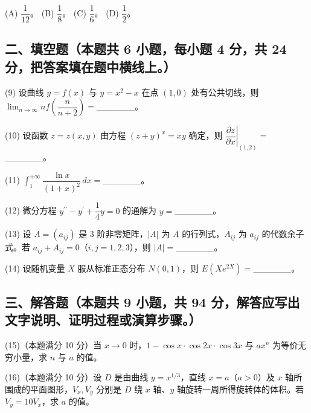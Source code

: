 \documentclass[UTF8,12pt]{ctexart}
\begin{document}
(A) \(\displaystyle \dfrac{\displaystyle 1}{\displaystyle 12}\)。 (B) \(\displaystyle \dfrac{\displaystyle 1}{\displaystyle 8}\)。 (C) \(\displaystyle \dfrac{\displaystyle 1}{\displaystyle 6}\)。 (D) \(\displaystyle \dfrac{\displaystyle 1}{\displaystyle 2}\)。


\subsection*{二、填空题（本题共 6 小题，每小题 4 分，共 24 分，把答案填在题中横线上。）}

(9) 设曲线 \(\displaystyle y=f(x)\) 与 \(\displaystyle y=x^2-x\) 在点 \(\displaystyle (1,\allowbreak 0)\) 处有公共切线，则 \(\displaystyle \lim_{n\to\infty}nf\left(\dfrac{\displaystyle n}{\displaystyle n+2}\right)=\)\_\_\_\_\_\_。


(10) 设函数 \(\displaystyle z=z(x,\allowbreak y)\) 由方程 \(\displaystyle (z+y)^x=xy\) 确定，则 \(\displaystyle \left.\dfrac{\displaystyle \partial z}{\displaystyle \partial x}\right|_{(1,\allowbreak 2)}=\)\_\_\_\_\_\_。


(11) \(\displaystyle \int_1^{+\infty}\dfrac{\displaystyle \ln x}{\displaystyle (1+x)^2}\,dx=\)\_\_\_\_\_\_。


(12) 微分方程 \(\displaystyle y^{\prime\prime}-y^{\prime}+\dfrac{\displaystyle 1}{\displaystyle 4}y=0\) 的通解为 \(\displaystyle y=\)\_\_\_\_\_\_。


(13) 设 \(\displaystyle A=(a_{ij})\) 是 3 阶非零矩阵，\(\displaystyle |A|\) 为 \(\displaystyle A\) 的行列式，\(\displaystyle A_{ij}\) 为 \(\displaystyle a_{ij}\) 的代数余子式。若 \(\displaystyle a_{ij}+A_{ij}=0\)（\(\displaystyle i,\allowbreak j=1,\allowbreak 2,\allowbreak 3\)），则 \(\displaystyle |A|=\)\_\_\_\_\_\_。


(14) 设随机变量 \(\displaystyle X\) 服从标准正态分布 \(\displaystyle N(0,\allowbreak 1)\)，则 \(\displaystyle E(Xe^{2X})=\)\_\_\_\_\_\_。


\subsection*{三、解答题（本题共 9 小题，共 94 分，解答应写出文字说明、证明过程或演算步骤。）}

(15)（本题满分 10 分）当 \(\displaystyle x\to0\) 时，\(\displaystyle 1-\cos x\cdot\cos2x\cdot\cos3x\) 与 \(\displaystyle ax^n\) 为等价无穷小量，求 \(\displaystyle n\) 与 \(\displaystyle a\) 的值。


(16)（本题满分 10 分）设 \(\displaystyle D\) 是由曲线 \(\displaystyle y=x^{1/3}\)，直线 \(\displaystyle x=a\)（\(\displaystyle a>0\)）及 \(\displaystyle x\) 轴所围成的平面图形，\(\displaystyle V_x,\allowbreak V_y\) 分别是 \(\displaystyle D\) 绕 \(\displaystyle x\) 轴、\(\displaystyle y\) 轴旋转一周所得旋转体的体积。若 \(\displaystyle V_y=10V_x\)，求 \(\displaystyle a\) 的值。
\end{document}
